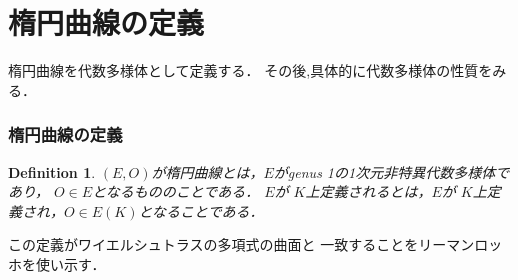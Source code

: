 \documentclass{ujarticle}
\newtheorem{dfn}[thm]{Definition}
\begin{document}
\section{楕円曲線の定義}
\label{sub:楕円曲線}
楕円曲線を代数多様体として定義する．
その後,具体的に代数多様体の性質をみる．
\subsubsection{楕円曲線の定義}
\label{subs:楕円曲線の定義}


\begin{dfn}
$(E,O)$が楕円曲線とは，$E$がgenus 1の1次元非特異代数多様体であり，
$O \in E$となるもののことである．
$E$が $ K $上定義されるとは，$E$が $K$上定義され，$O \in E(K)$となることである．
\end{dfn}

この定義がワイエルシュトラスの多項式の曲面と
一致することをリーマンロッホを使い示す．
\end{document}
